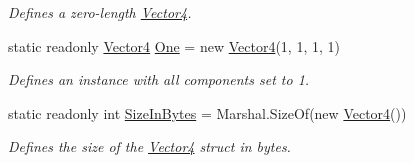 \begin{DoxyCompactItemize}
\begin{DoxyCompactList}\small\item\em Defines a zero-\/length \hyperlink{struct_open_t_k_1_1_vector4}{Vector4}. \end{DoxyCompactList}\item 
static readonly \hyperlink{struct_open_t_k_1_1_vector4}{Vector4} \hyperlink{struct_open_t_k_1_1_vector4_a085640a0147720f51f8bc370b2dc84fa}{One} = new \hyperlink{struct_open_t_k_1_1_vector4}{Vector4}(1, 1, 1, 1)
\begin{DoxyCompactList}\small\item\em Defines an instance with all components set to 1. \end{DoxyCompactList}\item 
static readonly int \hyperlink{struct_open_t_k_1_1_vector4_a9794982f6a708d35bdfb9cec9bf38f47}{Size\-In\-Bytes} = Marshal.\-Size\-Of(new \hyperlink{struct_open_t_k_1_1_vector4}{Vector4}())
\begin{DoxyCompactList}\small\item\em Defines the size of the \hyperlink{struct_open_t_k_1_1_vector4}{Vector4} struct in bytes. \end{DoxyCompactList}\end{DoxyCompactItemize}
